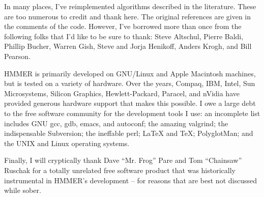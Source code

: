In many places, I've reimplemented algorithms described in the
literature. These are too numerous to credit and thank here. The
original references are given in the comments of the code. However,
I've borrowed more than once from the following folks that I'd like to
be sure to thank: Steve Altschul, Pierre Baldi, Phillip Bucher, Warren
Gish, Steve and Jorja Henikoff, Anders Krogh, and Bill Pearson.

HMMER is primarily developed on GNU/Linux and Apple Macintosh
machines, but is tested on a variety of hardware. Over the years,
Compaq, IBM, Intel, Sun Microsystems, Silicon Graphics,
Hewlett-Packard, Paracel, and nVidia have provided generous hardware
support that makes this possible. I owe a large debt to the free
software community for the development tools I use: an incomplete list
includes GNU gcc, gdb, emacs, and autoconf; the amazing valgrind; the
indispensable Subversion; the ineffable perl; LaTeX and TeX;
PolyglotMan; and the UNIX and Linux operating systems.

Finally, I will cryptically thank Dave ``Mr. Frog'' Pare and Tom
``Chainsaw'' Ruschak for a totally unrelated free software product
that was historically instrumental in HMMER's development -- for
reasons that are best not discussed while sober.

\label{manualend}
